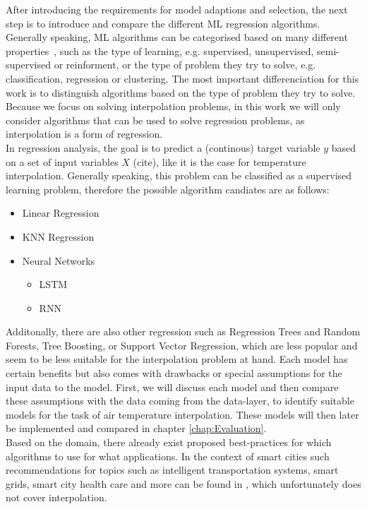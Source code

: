 After introducing the requirements for model adaptions and selection, the next step is to introduce and compare the different ML regression algorithms.
Generally speaking, ML algorithms can be categorised based on many different properties~\cite{sarker2021machine}, such as the type of learning, e.g. supervised, unsupervised, semi-supervised or reinforment, or the type of problem they try to solve, e.g. classification, regression or clustering. The most important differenciation for this work is to distinguish algorithms based on the type of problem they try to solve. Because we focus on solving interpolation problems, in this work we will only consider algorithms that can be used to solve regression problems, as interpolation is a form of regression.\\
In regression analysis, the goal is to predict a (continous) target variable $y$ based on a set of input variables $X$ (cite), like it is the case for temperature interpolation. Generally speaking, this problem can be classified as a supervised learning problem, therefore the possible algorithm candiates are as follows:

\begin{itemize}
    \item Linear Regression
    \item KNN Regression
    \item Neural Networks

    \begin{itemize}
        \item LSTM
        \item RNN
    \end{itemize}
\end{itemize}

Additonally, there are also other regression such as Regression Trees and Random Forests, Tree Boosting, or Support Vector Regression, which are less popular and seem to be less suitable for the interpolation problem at hand.
Each model has certain benefits but also comes with drawbacks or special assumptions for the input data to the model. First, we will discuss each model and then compare these assumptions with the data coming from the data-layer, to identify suitable models for the task of air temperature interpolation. These models will then later be implemented and compared in chapter \ref{chap:Evaluation}.\\
Based on the domain, there already exist proposed best-practices for which algorithms to use for what applications. In the context of smart cities such recommendations for topics such as intelligent transportation systems, smart grids, smart city health care and more can be found in \cite{ullah2020applications}, which unfortunately does not cover interpolation.

